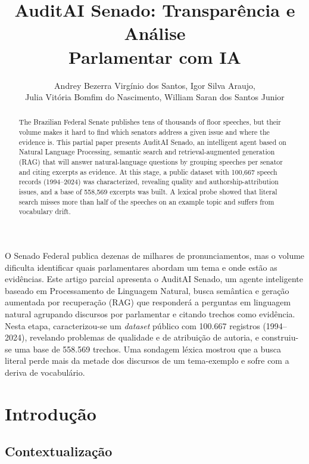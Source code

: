\documentclass[12pt]{article}
\title{AuditAI Senado: Transparência e Análise\\ Parlamentar com IA}
\author{Andrey Bezerra Virgínio dos Santos\inst{1}, Igor Silva Araujo\inst{1},\\
  Julia Vitória Bomfim do Nascimento\inst{1}, William Saran dos Santos Junior\inst{1}}
\begin{document}
\maketitle

\begin{abstract}
  The Brazilian Federal Senate publishes tens of thousands of floor speeches, but their volume
  makes it hard to find which senators address a given issue and where the evidence is. This
  partial paper presents AuditAI Senado, an intelligent agent based on Natural Language
  Processing, semantic search and retrieval-augmented generation (RAG) that will answer
  natural-language questions by grouping speeches per senator and citing excerpts as evidence.
  At this stage, a public dataset with 100,667 speech records (1994--2024) was characterized,
  revealing quality and authorship-attribution issues, and a base of 558,569 excerpts was built.
  A lexical probe showed that literal search misses more than half of the speeches on an example
  topic and suffers from vocabulary drift.
\end{abstract}

\begin{resumo}
  O Senado Federal publica dezenas de milhares de pronunciamentos, mas o volume dificulta
  identificar quais parlamentares abordam um tema e onde estão as evidências. Este artigo parcial
  apresenta o AuditAI Senado, um agente inteligente baseado em Processamento de Linguagem
  Natural, busca semântica e geração aumentada por recuperação (RAG) que responderá a perguntas
  em linguagem natural agrupando discursos por parlamentar e citando trechos como evidência.
  Nesta etapa, caracterizou-se um \textit{dataset} público com 100.667 registros (1994--2024),
  revelando problemas de qualidade e de atribuição de autoria, e construiu-se uma base de 558.569
  trechos. Uma sondagem léxica mostrou que a busca literal perde mais da metade dos discursos de
  um tema-exemplo e sofre com a deriva de vocabulário.
\end{resumo}

\section{Introdução}

\subsection{Contextualização}
\end{document}
